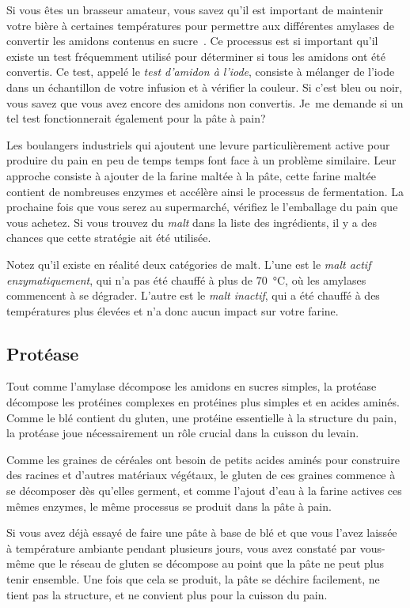 Si vous êtes un brasseur amateur, vous savez qu'il est important de maintenir votre bière à
certaines températures pour permettre aux différentes amylases de convertir les amidons contenus
en sucre~\cite{beer+amylase}. Ce processus est si important qu'il
existe un test fréquemment utilisé pour déterminer si tous les amidons
ont été convertis.
Ce test, appelé le \emph{test d'amidon à l'iode}, consiste à mélanger de l'iode dans
un échantillon de votre infusion et à vérifier la couleur. Si c'est bleu ou noir, vous savez
que vous avez encore des amidons non convertis. Je~me demande si un tel test fonctionnerait également
pour la pâte à pain?

Les boulangers industriels qui ajoutent une levure particulièrement active pour produire du pain en peu de temps
temps font face à un problème similaire. Leur approche consiste à ajouter de la farine maltée à
la pâte, cette farine maltée contient de nombreuses enzymes et accélère ainsi le
processus de fermentation. La prochaine fois que vous serez au supermarché, vérifiez le
l'emballage du pain que vous achetez. Si vous trouvez du \emph{malt} dans la liste des
ingrédients, il y a des chances que cette stratégie ait été utilisée.

Notez qu'il existe en réalité deux catégories de malt. L'une est le \emph{malt
actif enzymatiquement}, qui n'a pas été chauffé à plus de \qty{70}{\degreeCelsius}, où les amylases commencent
à se dégrader. L'autre est le \emph{malt inactif}, qui a été chauffé à des températures plus élevées et n'a donc aucun impact sur votre farine.

\subsection{Protéase}

Tout comme l'amylase décompose les amidons en sucres simples, la protéase décompose
les protéines complexes en protéines plus simples et en acides aminés. Comme le blé
contient du gluten, une protéine essentielle à la structure du pain,
la protéase joue nécessairement un rôle crucial dans la cuisson du levain.

Comme les graines de céréales ont besoin de petits acides aminés pour construire des racines et d'autres
matériaux végétaux, le gluten de ces graines commence à se décomposer dès qu'elles germent, et comme l'ajout d'eau à la farine
actives ces mêmes enzymes,
le même processus se produit dans la pâte à pain.

Si vous avez déjà essayé de faire une pâte à base de blé et que vous l'avez laissée à température ambiante pendant plusieurs jours, vous avez constaté par vous-même que
le réseau de gluten se décompose au point que la pâte ne peut plus tenir ensemble. Une fois
que cela se produit, la pâte se déchire facilement, ne tient pas la structure, et ne
convient plus pour la cuisson du pain.

